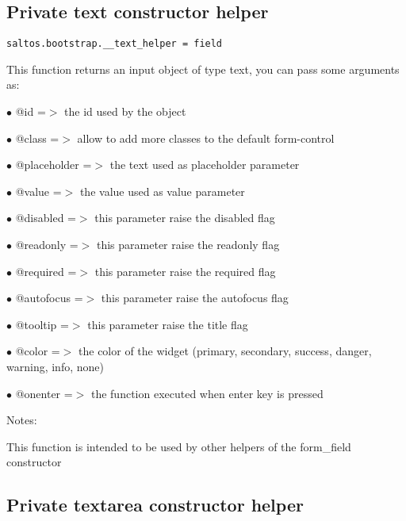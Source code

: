 \documentclass[a4paper]{book}
\begin{document}
\hypertarget{toc491}{}
\subsection{Private text constructor helper}

\begin{lstlisting}
saltos.bootstrap.__text_helper = field
\end{lstlisting}

This function returns an input object of type text, you can pass some arguments as:

\begin{compactitem}
\item[\color{myblue}$\bullet$] @id          =$>$ the id used by the object
\item[\color{myblue}$\bullet$] @class       =$>$ allow to add more classes to the default form-control
\item[\color{myblue}$\bullet$] @placeholder =$>$ the text used as placeholder parameter
\item[\color{myblue}$\bullet$] @value       =$>$ the value used as value parameter
\item[\color{myblue}$\bullet$] @disabled    =$>$ this parameter raise the disabled flag
\item[\color{myblue}$\bullet$] @readonly    =$>$ this parameter raise the readonly flag
\item[\color{myblue}$\bullet$] @required    =$>$ this parameter raise the required flag
\item[\color{myblue}$\bullet$] @autofocus   =$>$ this parameter raise the autofocus flag
\item[\color{myblue}$\bullet$] @tooltip     =$>$ this parameter raise the title flag
\item[\color{myblue}$\bullet$] @color       =$>$ the color of the widget (primary, secondary, success, danger, warning, info, none)
\item[\color{myblue}$\bullet$] @onenter     =$>$ the function executed when enter key is pressed
\end{compactitem}

Notes:

This function is intended to be used by other helpers of the form\_field constructor

\hypertarget{toc492}{}
\subsection{Private textarea constructor helper}
\end{document}
